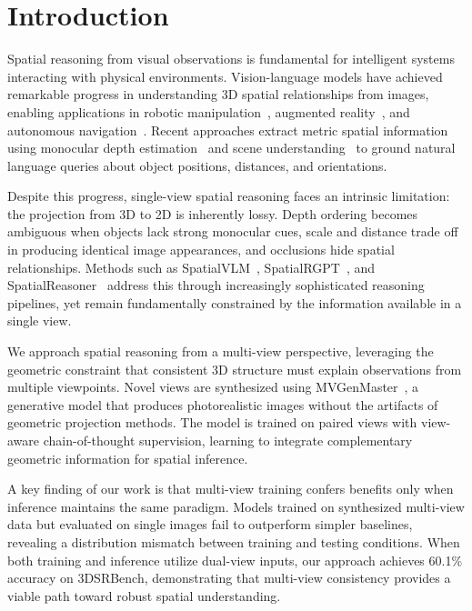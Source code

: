 \section{Introduction}
\label{sec:intro}
Spatial reasoning from visual observations is fundamental for intelligent systems interacting with physical environments. Vision-language models have achieved remarkable progress in understanding 3D spatial relationships from images, enabling applications in robotic manipulation~\cite{bohg2014robot}, augmented reality~\cite{azuma1997survey}, and autonomous navigation~\cite{boninfont2008visual}. Recent approaches extract metric spatial information using monocular depth estimation~\cite{yang2024depth} and scene understanding~\cite{ravi2024sam} to ground natural language queries about object positions, distances, and orientations.

Despite this progress, single-view spatial reasoning faces an intrinsic limitation: the projection from 3D to 2D is inherently lossy. Depth ordering becomes ambiguous when objects lack strong monocular cues, scale and distance trade off in producing identical image appearances, and occlusions hide spatial relationships. Methods such as SpatialVLM~\cite{chen2024spatialvlm}, SpatialRGPT~\cite{cheng2024spatialrgpt}, and SpatialReasoner~\cite{ma2025spatialreasoner} address this through increasingly sophisticated reasoning pipelines, yet remain fundamentally constrained by the information available in a single view.

We approach spatial reasoning from a multi-view perspective, leveraging the geometric constraint that consistent 3D structure must explain observations from multiple viewpoints. Novel views are synthesized using MVGenMaster~\cite{ren2025mvgenmaster}, a generative model that produces photorealistic images without the artifacts of geometric projection methods. The model is trained on paired views with view-aware chain-of-thought supervision, learning to integrate complementary geometric information for spatial inference.

A key finding of our work is that multi-view training confers benefits only when inference maintains the same paradigm. Models trained on synthesized multi-view data but evaluated on single images fail to outperform simpler baselines, revealing a distribution mismatch between training and testing conditions. When both training and inference utilize dual-view inputs, our approach achieves 60.1\% accuracy on 3DSRBench, demonstrating that multi-view consistency provides a viable path toward robust spatial understanding.

